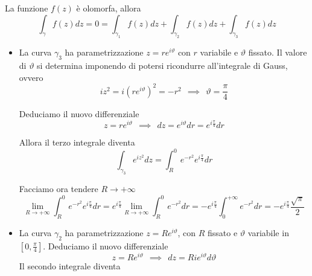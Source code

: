 La funzione $f\left(z\right)$ è olomorfa, allora
\begin{equation*}
{\displaystyle \int\nolimits _{\gamma } f\left(z\right) dz = 0 = \int\nolimits _{\gamma _{1}} f\left(z\right) dz + \int\nolimits _{\gamma _{2}} f\left(z\right) dz + \int\nolimits _{\gamma _{3}} f}\left(z\right) dz
\end{equation*}
\begin{itemize}
\item La curva $\gamma _{3}$ ha parametrizzazione $z = re^{i\vartheta }$ con $r$ variabile e $\vartheta $ fissato. Il valore di $\vartheta $ si determina imponendo di potersi ricondurre all'integrale di Gauss, ovvero\begin{equation*}
iz^{2} = i\left(re^{i\vartheta }\right)^{2} = - r^{2} \ \ \implies \ \ \vartheta = \frac{\pi }{4}
\end{equation*}

Deduciamo il nuovo differenziale\begin{equation*}
z = re^{i\vartheta } \ \ \implies \ \ dz = e^{i\vartheta } dr = e^{i\frac{\pi }{4}} dr
\end{equation*}

Allora il terzo integrale diventa\begin{equation*}
\int\nolimits _{\gamma _{3}} e^{iz^{2}} dz = \int\nolimits ^{0}_{R} e^{ - r^{2}} e^{i\frac{\pi }{4}} dr
\end{equation*}

Facciamo ora tendere $R\rightarrow + \infty $\begin{equation*}
\lim\limits _{R\rightarrow + \infty }\int\nolimits ^{0}_{R} e^{ - r^{2}} e^{i\frac{\pi }{4}} dr = e^{i\frac{\pi }{4}}\lim\limits _{R\rightarrow + \infty }\int\nolimits ^{0}_{R} e^{ - r^{2}} dr = -e^{i\frac{\pi }{4}}\int\nolimits ^{ + \infty }_{0} e^{ - r^{2}} dr = -e^{i\frac{\pi }{4}}\frac{\sqrt{\pi }}{2}
\end{equation*}
\item La curva $\gamma _{2}$ ha parametrizzazione $z = Re^{i\vartheta }$, con $R$ fissato e $\vartheta $ variabile in $\left[ 0,\frac{\pi }{4}\right]$. Deduciamo il nuovo differenziale\begin{equation*}
z = Re^{i\vartheta } \ \ \implies \ \ dz = Rie^{i\vartheta } d\vartheta 
\end{equation*}Il secondo integrale diventa


\end{itemize}

